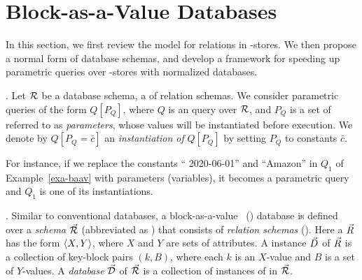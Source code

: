 \vspace{-0.3ex}
\section{Block-as-a-Value Databases}
\label{sec-schema}
\vspace{-0.3ex}

In this section, 
we first review the \baav model for relations in \kv-stores. We
then propose a normal form of \baav database schemas, and develop a
framework for speeding up 
parametric queries over \kv-stores with normalized \baav databases.


.
Let ${\mathcal R}$ be a database schema, \ie a  of relation schemas.  
We consider parametric queries of the form $Q[P_{Q}]$, where
$Q$ is an \SQL query over ${\mathcal R}$, and $P_{Q}$ is a set of  referred to as {\em parameters}, whose values will
be instantiated before %
execution.
We denote by $Q[P_{Q} = \bar  c]$
an {\em instantiation of} $Q[P_{Q}]$
  by setting $P_{Q}$ to constants $\bar c$.

\vspace{0.6ex}
For instance, if we replace the constants ``{\normalsize
2020-06-01}'' and ``{\normalsize Amazon}'' in $Q_{1}$ of
  Example~\ref{exa-baav} with parameters (variables),
  it becomes a
parametric query and $Q_{1}$ is one of its instantiations.


. Similar to conventional %
databases, a block-as-a-value~\cite{VLDB19} (\baav) database is
defined over a {\em \baav schema} $\vec{{\mathcal R}}$ (abbreviated
as \bds) that consists of {\em \baav relation schemas}
(\bss). Here a \bs $\vec{R}$ has the form $\langle X,\allowbreak Y\rangle$,
where $X$ and $Y$ are sets of attributes. A \baav instance
$\vec{D}$ of $\vec{R}$ is a collection of key-block pairs $(k, B)$,
where each $k$ is an $X$-value and $B$ is a set of $Y$-values.
A {\em \baav database} $\vec{\mathcal D}$ of \bds $\vec{{\mathcal R}}$ is a
collection of \baav instances of \bss in $\vec{{\mathcal R}}$.

